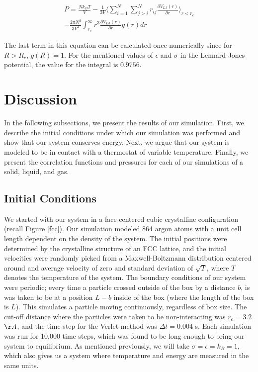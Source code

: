 \documentclass{article}
\begin{document}
\begin{multicols}{2}
\begin{equation}
\begin{split}
P = \frac{N k_B T}{V} - \frac{1}{3 V} \langle \sum\limits_{i=1}^N \sum\limits_{j>i}^N r_{ij} \frac{\partial V_{LJ}(r)}{\partial r}\rangle_{r < r_c} \\
- \frac{2 \pi N^2}{3 V^2} \int_{r_c}^\infty r^3 \frac{\partial V_{LJ}(r)}{\partial r} g(r) dr
\label{prescomp}
\end{split}
\end{equation}

\noindent The last term in this equation can be calculated once numerically since for $R>R_c$, $g(R) = 1$. For the mentioned values of $\epsilon$ and $\sigma$ in the Lennard-Jones potential, the value for the integral is $0.9756$.

\section{Discussion}
\label{disc}

In the following subsections, we present the results of our simulation.  First, we describe the initial conditions under which our simulation was performed and show that our system conserves energy.  Next, we argue that our system is modeled to be in contact with a thermostat of variable temperature.  Finally, we present the correlation functions and pressures for each of our simulations of a solid, liquid, and gas.

\subsection{Initial Conditions}

We started with our system in a face-centered cubic crystalline configuration (recall Figure \ref{fcc}).  Our simulation modeled 864 argon atoms with a unit cell length dependent on the density of the system.  The initial positions were determined by the crystalline structure of an FCC lattice, and the initial velocities were randomly picked from a Maxwell-Boltzmann distribution centered around and average velocity of zero and standard deviation of $\sqrt{T}$, where $T$ denotes the temperature of the system.  The boundary conditions of our system were periodic; every time a particle crossed outside of the box by a distance $b$, is was taken to be at a position $L-b$ inside of the box (where the length of the box is $L$).  This simulates a particle moving continuously, regardless of box size.  The cut-off distance where the particles were taken to be non-interacting was $r_c = 3.2$ $\AA$, and the time step for the Verlet method was $\Delta t = 0.004$ s.  Each simulation was run for 10,000 time steps, which was found to be long enough to bring our system to equilibrium.  As mentioned previously, we will take $\sigma=\epsilon=k_B=1$, which also gives us a system where temperature and energy are measured in the same units.  


\end{multicols}
\end{document}
